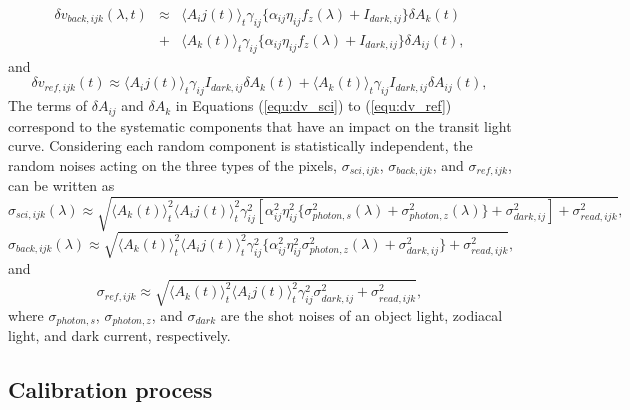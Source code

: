 \documentclass{aastex62}
\def\hoge<#1>{\langle #1 \rangle}
\begin{document}
\begin{eqnarray}
\label{equ:dv_back}
{\delta}v_{back,ijk}(\lambda,t) &\approx& \hoge<A_{ij}(t)>_{t}\gamma_{ij}\{\alpha_{ij}\eta_{ij}f_{z}(\lambda)+I_{dark,ij}\}{\delta}A_{k}(t) \nonumber \\
&+&\hoge<A_{k}(t)>_{t}\gamma_{ij}\{\alpha_{ij}\eta_{ij}f_{z}(\lambda)+I_{dark,ij}\}{\delta}A_{ij}(t) ,
\end{eqnarray}
and
\begin{equation}
\label{equ:dv_ref}
{\delta}v_{ref,ijk}(t) \approx \hoge<A_{ij}(t)>_{t}\gamma_{ij}I_{dark,ij}{\delta}A_{k}(t)+\hoge<A_{k}(t)>_{t}\gamma_{ij}I_{dark,ij}{\delta}A_{ij}(t) ,
\end{equation}
The terms of ${\delta}A_{ij}$ and ${\delta}A_{k}$ in Equations (\ref{equ:dv_sci}) to (\ref{equ:dv_ref}) correspond to the systematic components that have an impact on the transit light curve. Considering each random component is statistically independent, the random noises acting on the three types of the pixels, $\sigma_{sci,ijk}$, $\sigma_{back,ijk}$, and $\sigma_{ref,ijk}$, can be written as
\begin{equation}
\label{equ:sig_sci}
\sigma_{sci,ijk}(\lambda) \approx \sqrt{\hoge<A_{k}(t)>^2_t\hoge<A_{ij}(t)>^2_{t}\gamma^2_{ij}[\alpha^2_{ij}\eta^2_{ij}\{\sigma^2_{photon,s}(\lambda)+\sigma^2_{photon,z}(\lambda)\}+\sigma^2_{dark,ij}]+\sigma^2_{read,ijk}} ,
\end{equation}
\begin{equation}
\label{equ:sig_back}
\sigma_{back,ijk}(\lambda) \approx \sqrt{\hoge<A_{k}(t)>^2_t\hoge<A_{ij}(t)>^2_{t}\gamma^2_{ij}\{\alpha^2_{ij}\eta^2_{ij}\sigma^2_{photon,z}(\lambda)+\sigma^2_{dark,ij}\}+\sigma^2_{read,ijk}} ,
\end{equation}
and
\begin{equation}
\label{equ:sig_ref}
\sigma_{ref,ijk} \approx \sqrt{\hoge<A_{k}(t)>^2_t\hoge<A_{ij}(t)>^2_{t}\gamma^2_{ij}\sigma^2_{dark,ij}+\sigma^2_{read,ijk}} ,
\end{equation}
where $\sigma_{photon,s}$, $\sigma_{photon,z}$, and $\sigma_{dark}$ are the shot noises of an object light, zodiacal light, and dark current, respectively.


\subsection{Calibration process} \label{subsec:calibration}
\end{document}
